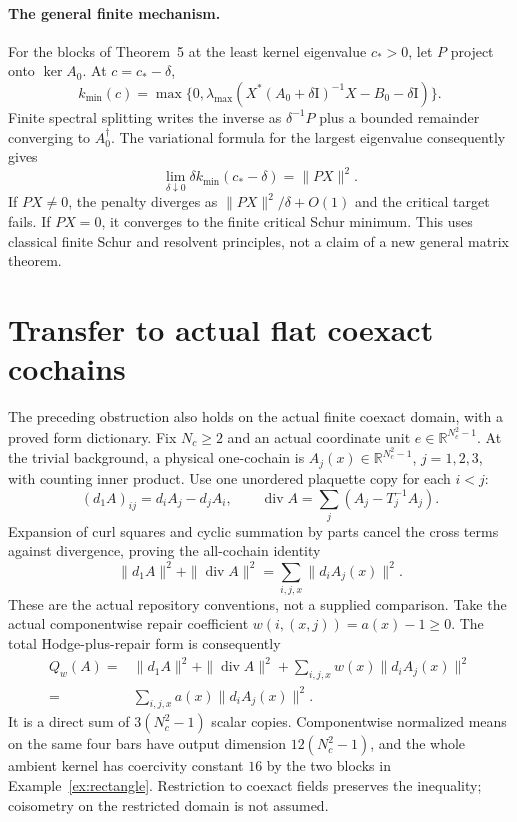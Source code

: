 \documentclass[11pt,a4paper]{article}
\newcommand{\R}{\mathbb R}
\newcommand{\id}{\mathrm I}
\begin{document}
\paragraph{The general finite mechanism.}
For the blocks of Theorem~5 at the least kernel eigenvalue $c_*>0$,
let $P$ project onto $\ker A_0$. At $c=c_*-\delta$,
\[
 k_{\min}(c)=\max\{0,\lambda_{\max}(
 X^*(A_0+\delta\id)^{-1}X-B_0-\delta\id)\}.
\]
Finite spectral splitting writes the inverse as $\delta^{-1}P$ plus a
bounded remainder converging to $A_0^\dagger$. The variational formula
for the largest eigenvalue consequently gives
\[
 \lim_{\delta\downarrow0}\delta k_{\min}(c_*-\delta)=\|PX\|^2.
\]
If $PX\ne0$, the penalty diverges as $\|PX\|^2/\delta+O(1)$ and the
critical target fails. If $PX=0$, it converges to the finite critical
Schur minimum. This uses classical finite Schur and resolvent principles,
not a claim of a new general matrix theorem.

\section{Transfer to actual flat coexact cochains}
The preceding obstruction also holds on the actual finite coexact domain,
with a proved form dictionary. Fix $N_c\geq2$ and an actual coordinate unit
$e\in\R^{N_c^2-1}$. At the trivial background, a physical one-cochain is
$A_j(x)\in\R^{N_c^2-1}$, $j=1,2,3$, with counting inner product. Use one
unordered plaquette copy for each $i<j$:
\[
 (d_1 A)_{ij}=d_iA_j-d_jA_i,\qquad
 \operatorname{div}A=\sum_j(A_j-T_j^{-1}A_j).
\]
Expansion of curl squares and cyclic summation by parts cancel the cross
terms against divergence, proving the all-cochain identity
\[
 \|d_1A\|^2+\|\operatorname{div}A\|^2=\sum_{i,j,x}\|d_iA_j(x)\|^2.
\]
These are the actual repository conventions, not a supplied comparison.
Take the actual componentwise repair coefficient $w(i,(x,j))=a(x)-1\geq0$.
The total Hodge-plus-repair form is consequently
\begin{equation}\label{eq:physical-dictionary}
 \begin{aligned} Q_w(A)={}&\|d_1A\|^2+\|\operatorname{div}A\|^2+
 \sum_{i,j,x}w(x)\|d_iA_j(x)\|^2
 \\ ={}&\sum_{i,j,x}a(x)\|d_iA_j(x)\|^2. \end{aligned}
\end{equation}
It is a direct sum of $3(N_c^2-1)$ scalar copies. Componentwise normalized
means on the same four bars have output dimension $12(N_c^2-1)$, and
the whole ambient kernel has coercivity constant $16$ by the two blocks
in Example~\ref{ex:rectangle}. Restriction to coexact fields preserves the
inequality; coisometry on the restricted domain is not assumed.
\end{document}

